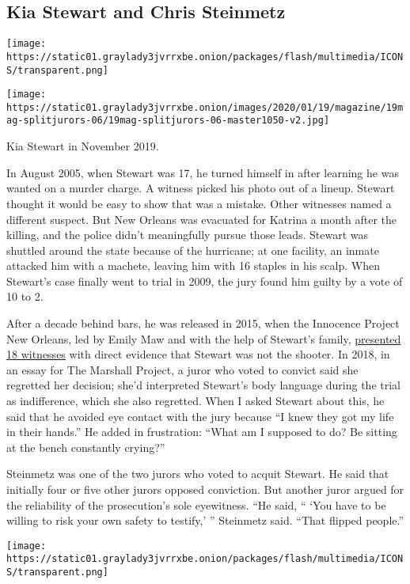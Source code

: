 \hypertarget{kia-stewart-and-chris-steinmetz}{%
\subsection{Kia Stewart and Chris
Steinmetz}\label{kia-stewart-and-chris-steinmetz}}

\texttt{[image: https://static01.graylady3jvrrxbe.onion/packages/flash/multimedia/ICONS/transparent.png]}

\texttt{[image: https://static01.graylady3jvrrxbe.onion/images/2020/01/19/magazine/19mag-splitjurors-06/19mag-splitjurors-06-master1050-v2.jpg]}

Kia Stewart in November 2019.

In August 2005, when Stewart was 17, he turned himself in after learning
he was wanted on a murder charge. A witness picked his photo out of a
lineup. Stewart thought it would be easy to show that was a mistake.
Other witnesses named a different suspect. But New Orleans was evacuated
for Katrina a month after the killing, and the police didn't
meaningfully pursue those leads. Stewart was shuttled around the state
because of the hurricane; at one facility, an inmate attacked him with a
machete, leaving him with 16 staples in his scalp. When Stewart's case
finally went to trial in 2009, the jury found him guilty by a vote of 10
to 2.

After a decade behind bars, he was released in 2015, when the Innocence
Project New Orleans, led by Emily Maw and with the help of Stewart's
family,
\href{https://ip-no.org/what-we-do/free-innocent-prisoners/client-profiles/kia-stewart/}{presented
18 witnesses} with direct evidence that Stewart was not the shooter. In
2018, in an essay for The Marshall Project, a juror who voted to convict
said she regretted her decision; she'd interpreted Stewart's body
language during the trial as indifference, which she also regretted.
When I asked Stewart about this, he said that he avoided eye contact
with the jury because ``I knew they got my life in their hands.'' He
added in frustration: ``What am I supposed to do? Be sitting at the
bench constantly crying?''

Steinmetz was one of the two jurors who voted to acquit Stewart. He said
that initially four or five other jurors opposed conviction. But another
juror argued for the reliability of the prosecution's sole eyewitness.
``He said, `` `You have to be willing to risk your own safety to
testify,' '' Steinmetz said. ``That flipped people.''

\texttt{[image: https://static01.graylady3jvrrxbe.onion/packages/flash/multimedia/ICONS/transparent.png]}

